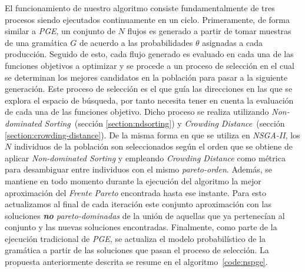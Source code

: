 El funcionamiento de nuestro algoritmo consiste fundamentalmente de tres procesos siendo ejecutados continuamente en un ciclo.
Primeramente, de forma similar a \emph{PGE}, un conjunto de $N$ flujos es generado a partir de tomar muestras de una gramática $G$ de acuerdo a las probabilidades $\theta$ asignadas a cada producción.
Seguido de esto, cada flujo generado es evaluado en cada una de las funciones objetivos a optimizar y se procede a un proceso de selección en el cual se determinan los mejores candidatos en la población para pasar a la siguiente generación.
Este proceso de selección es el que guía las direcciones en las que se explora el espacio de búsqueda, por tanto necesita tener en cuenta la evaluación de cada una de las funciones objetivo.
Dicho proceso se realiza utilizando \emph{Non-dominated Sorting}~(sección \ref{section:ndsorting}) y \emph{Crowding Distance}~(sección \ref{section:crowding-distance}).
De la misma forma en que se utiliza en \emph{NSGA-II}, los $N$ individuos de la población son seleccionados según el orden que se obtiene de aplicar \emph{Non-dominated Sorting} y empleando \emph{Crowding Distance} como métrica para desambiguar entre individuos con el mismo \emph{pareto-orden}.
Además, se mantiene en todo momento durante la ejecución del algoritmo la mejor aproximación del \emph{Frente Pareto} encontrada hasta ese instante.
Para esto actualizamos al final de cada iteración este conjunto aproximación con las soluciones \emph{\textbf{no} pareto-dominadas} de la unión de aquellas que ya pertenecían al conjunto y las nuevas soluciones encontradas.
Finalmente, como parte de la ejecución tradicional de \emph{PGE}, se actualiza el modelo probabilístico de la gramática a partir de las soluciones que pasan el proceso de selección.
La propuesta anteriormente descrita se resume en el algoritmo~\ref{code:nspge}.


